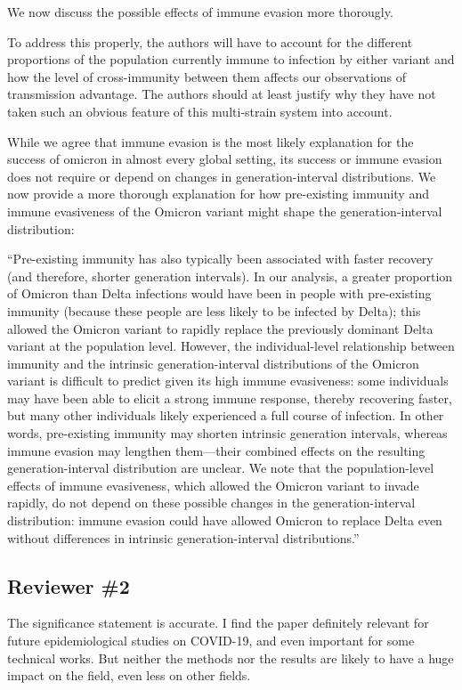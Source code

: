 \documentclass[12pt]{article}
\newcommand{\rev}{\subsection*}
\newcommand{\revtext}{\textsf}
\begin{document}
We now discuss the possible effects of immune evasion more thorougly. 

\revtext{To address this properly, the authors will have to account for the different proportions of the population currently immune to infection by either variant and how the level of cross-immunity between them affects our observations of transmission advantage. The authors should at least justify why they have not taken such an obvious feature of this multi-strain system into account.}

While we agree that immune evasion is the most likely explanation for the success of omicron in almost every global setting, its success or immune evasion does not require or depend on changes in generation-interval distributions.
We now provide a more thorough explanation for how pre-existing immunity and immune evasiveness of the Omicron variant might shape the generation-interval distribution: 

``Pre-existing immunity has also typically been associated with faster recovery \citep{kissler2021viral} (and therefore, shorter generation intervals).
In our analysis, a greater proportion of Omicron than Delta infections would have been in people with pre-existing immunity (because these people are less likely to be infected by Delta);
this allowed the Omicron variant to rapidly replace the previously dominant Delta variant at the population level.
However, the individual-level relationship between immunity and the intrinsic generation-interval distributions of the Omicron variant is difficult to predict given its high immune evasiveness:
some individuals may have been able to elicit a strong immune response, thereby recovering faster, but many other individuals likely experienced a full course of infection.
In other words, pre-existing immunity may shorten intrinsic generation intervals, whereas immune evasion may lengthen them---their combined effects on the resulting generation-interval distribution are unclear.
We note that the population-level effects of immune evasiveness, which allowed the Omicron variant to invade rapidly, do not depend on these possible changes in the generation-interval distribution:
immune evasion could have allowed Omicron to replace Delta even without differences in intrinsic generation-interval distributions.''

\rev{Reviewer \#2}

\revtext{The significance statement is accurate. I find the paper definitely relevant for future epidemiological studies on COVID-19, and even important for some technical works. But neither the methods nor the results are likely to have a huge impact on the field, even less on other fields.}
\end{document}
